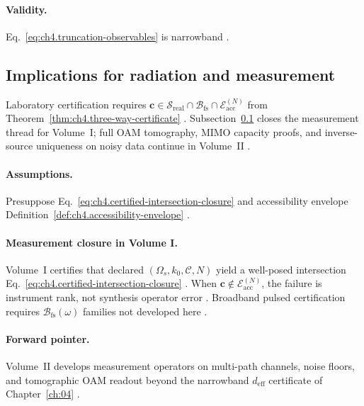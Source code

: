 \paragraph{Validity.}
Eq.~\eqref{eq:ch4.truncation-observables} is narrowband \cite{stratton1941}.


\subsection{Implications for radiation and measurement}
\label{sec:ch494}

Laboratory certification requires \(\mathbf{c}\in\mathcal{S}_{\mathrm{real}}\cap\mathcal{B}_{\mathrm{fs}}\cap\mathcal{E}_{\mathrm{acc}}^{(N)}\)
from Theorem~\ref{thm:ch4.three-way-certificate} \cite{harrington2001,devaney2004,hansen1988}. Subsection~\ref{sec:ch494} closes the
measurement thread for Volume~I; full OAM tomography, MIMO capacity proofs, and inverse-source uniqueness on noisy data continue in
Volume~II \cite{stratton1941}.

\paragraph{Assumptions.}
Presuppose Eq.~\eqref{eq:ch4.certified-intersection-closure} and accessibility envelope
Definition~\ref{def:ch4.accessibility-envelope} \cite{harrington2001,devaney2004}.

\paragraph{Measurement closure in Volume I.}
Volume~I certifies that declared \((\Omega_{s},k_{0},\mathcal{C},N)\) yield a well-posed intersection
Eq.~\eqref{eq:ch4.certified-intersection-closure} \cite{stratton1941,hansen1988}. When \(\mathbf{c}\notin\mathcal{E}_{\mathrm{acc}}^{(N)}\),
the failure is instrument rank, not synthesis operator error \cite{harrington2001,devaney2004}. Broadband pulsed certification requires
\(\mathcal{B}_{\mathrm{fs}}(\omega)\) families not developed here \cite{jackson1999}.

\paragraph{Forward pointer.}
Volume~II develops measurement operators on multi-path channels, noise floors, and tomographic OAM readout beyond the narrowband
\(d_{\mathrm{eff}}\) certificate of Chapter~\ref{ch:04} \cite{harrington2001,devaney2004}.

